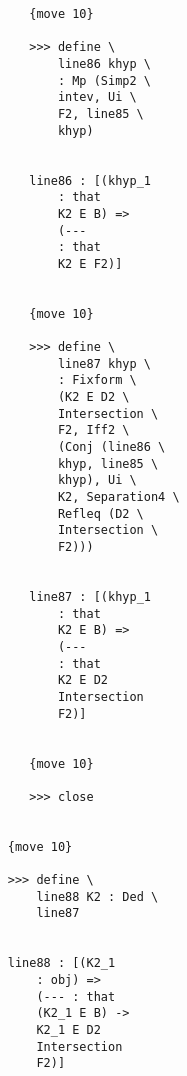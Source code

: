 \documentclass[12pt]{article}
\begin{document}
\begin{verbatim}
                                 {move 10}

                                 >>> define \
                                     line86 khyp \
                                     : Mp (Simp2 \
                                     intev, Ui \
                                     F2, line85 \
                                     khyp)


                                 line86 : [(khyp_1 
                                     : that 
                                     K2 E B) => 
                                     (--- 
                                     : that 
                                     K2 E F2)]


                                 {move 10}

                                 >>> define \
                                     line87 khyp \
                                     : Fixform \
                                     (K2 E D2 \
                                     Intersection \
                                     F2, Iff2 \
                                     (Conj (line86 \
                                     khyp, line85 \
                                     khyp), Ui \
                                     K2, Separation4 \
                                     Refleq (D2 \
                                     Intersection \
                                     F2)))


                                 line87 : [(khyp_1 
                                     : that 
                                     K2 E B) => 
                                     (--- 
                                     : that 
                                     K2 E D2 
                                     Intersection 
                                     F2)]


                                 {move 10}

                                 >>> close


                              {move 10}

                              >>> define \
                                  line88 K2 : Ded \
                                  line87


                              line88 : [(K2_1 
                                  : obj) => 
                                  (--- : that 
                                  (K2_1 E B) -> 
                                  K2_1 E D2 
                                  Intersection 
                                  F2)]



\end{verbatim}
\end{document}
